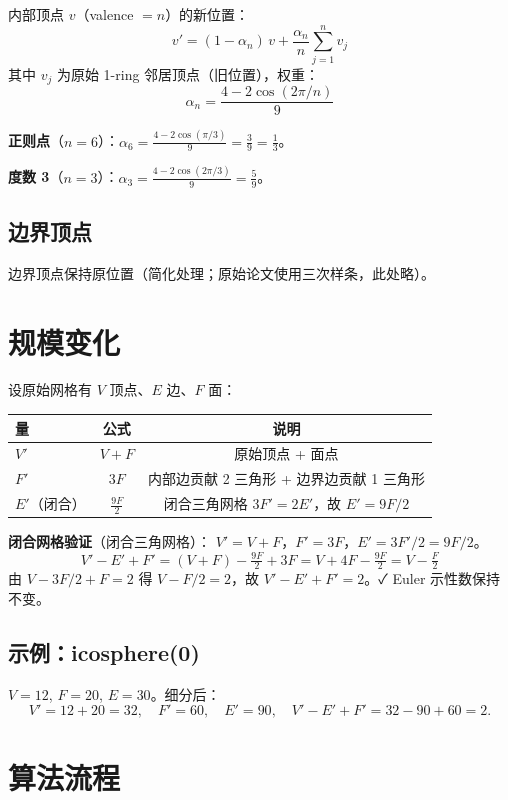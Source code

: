 \documentclass[11pt,a4paper]{article}
\begin{document}
内部顶点 $v$（valence $= n$）的新位置：
$$
  v' = (1 - \alpha_n)\, v + \frac{\alpha_n}{n} \sum_{j=1}^{n} v_j
$$
其中 $v_j$ 为原始 1-ring 邻居顶点（旧位置），权重：
$$
  \alpha_n = \frac{4 - 2\cos(2\pi/n)}{9}
$$

\textbf{正则点}（$n=6$）：$\alpha_6 = \frac{4 - 2\cos(\pi/3)}{9} = \frac{3}{9} = \frac{1}{3}$。

\textbf{度数 3}（$n=3$）：$\alpha_3 = \frac{4 - 2\cos(2\pi/3)}{9} = \frac{5}{9}$。

\subsection{边界顶点}

边界顶点保持原位置（简化处理；原始论文使用三次样条，此处略）。

\section{规模变化}

设原始网格有 $V$ 顶点、$E$ 边、$F$ 面：

\begin{center}
\renewcommand{\arraystretch}{1.18}
\begin{tabular}{@{}lcc@{}}
  \toprule
  \textbf{量} & \textbf{公式} & \textbf{说明} \\
  \midrule
  $V'$ & $V + F$ & 原始顶点 + 面点 \\
  $F'$ & $3F$ & 内部边贡献 2 三角形 + 边界边贡献 1 三角形 \\
  $E'$（闭合） & $\tfrac{9F}{2}$ & 闭合三角网格 $3F' = 2E'$，故 $E' = 9F/2$ \\
  \bottomrule
\end{tabular}
\end{center}

\textbf{闭合网格验证}（闭合三角网格）：
$V' = V + F$，$F' = 3F$，$E' = 3F'/2 = 9F/2$。
$$
  V' - E' + F' = (V + F) - \tfrac{9F}{2} + 3F = V + 4F - \tfrac{9F}{2} = V - \tfrac{F}{2}
$$
由 $V - 3F/2 + F = 2$ 得 $V - F/2 = 2$，故 $V' - E' + F' = 2$。✓
Euler 示性数保持不变。

\subsection{示例：icosphere(0)}

$V=12$, $F=20$, $E=30$。细分后：
$$V' = 12 + 20 = 32, \quad F' = 60, \quad E' = 90, \quad V'-E'+F' = 32-90+60 = 2.$$

\section{算法流程}
\end{document}
